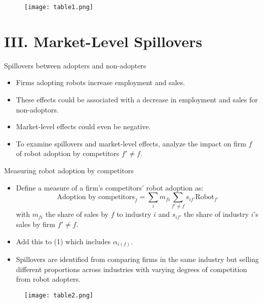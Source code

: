 \documentclass[notes=show]{beamer}
\begin{document}
\newpage
\begin{center}
\vspace*{0.2cm}
\begin{figure}
\texttt{[image: table1.png]}
\end{figure} 
\end{center}
\newpage

\section{III. Market-Level Spillovers}

\begin{frame}{Spillovers between adopters and non-adopters}
\begin{itemize}
\item Firms adopting robots increase employment and sales. \medskip 
\item These effects could be associated with a decrease in employment and sales for non-adoptors. \medskip
\item Market-level effects could even be negative. \medskip 
\item To examine spillovers and market-level effects, analyze the impact on firm $f$ of robot adoption by competitors $ f' \neq f $.
\end{itemize}
\end{frame}

\begin{frame}{Measuring robot adoption by competitors}
\begin{itemize}
\item Define a measure of a firm's competitors' robot adoption as:
\[
\text{Adoption by competitors}_{f} = \sum_{i} m_{fi} \sum_{f' \neq f} s_{if'} \text{Robot}_{f'}
\]
with $ m_{fi} $ the share of sales by $f$ to industry $i$ and $ s_{if'} $ the share of industry $i$'s sales by firm $f' \neq f$.  \medskip
\item Add this to (1) which includes $ \alpha_{i(f)}$. \medskip
\item Spillovers are identified from comparing firms in the same industry but selling different proportions across industries with varying degrees of competition from robot adopters.
\end{itemize}
\end{frame}

\newpage
\begin{center}
\vspace*{0.2cm}
\begin{figure}
\texttt{[image: table2.png]}
\end{figure} 
\end{center}
\newpage
\end{document}
